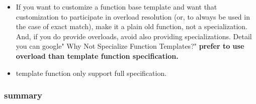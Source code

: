 \documentclass[a4paper,12pt,twoside]{book}
\begin{document}
\begin{itemize}
\item  If you want to customize a function base template and want that customization to participate in overload resolution (or, to always be used in the case of exact match), make it a plain old function, not a specialization. And, if you do provide overloads, avoid also providing specializations. Detail you can google" Why Not Specialize Function Templates?" \textbf{prefer to use overload than template function specification.}

\item template function only support full specification. 
\end{itemize}

\subsubsection{summary}
\end{document}

